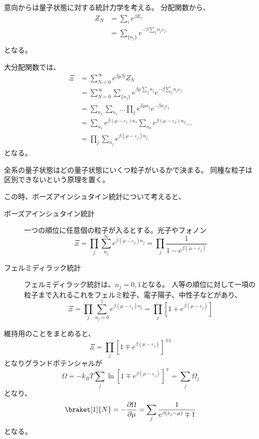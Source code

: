 \documentclass[titlepage]{ltjsarticle}
\newcommand{\ev}[1]{\braket[1]{#1}}
\begin{document}
意向からは量子状態に対する統計力学を考える。
分配関数から、
\begin{align}
  Z_N & = \sum_i e^{\beta E_i} \\
  & = \sum_{\{n_j\}} e^{-\beta \sum_j n_j \varepsilon_j} \\
\end{align}
となる。

大分配関数では、
\begin{align}
  \Xi & = \sum_{N=0}^{\infty}e^{\beta \mu N} Z_N \\
  & = \sum_{N=0}^{\infty}\sum_{\{n_j\}}^{}e^{\beta \mu \sum_j n_j} e^{-\beta \sum_j n_j \varepsilon_j} \\
  & = \sum_{n_1}\sum_{n_1}\dots \prod_j e^{\beta \mu n_j} e^{-\beta n_j \varepsilon_j} \\
  & = \sum_{n_1} e^{\beta(\mu - \varepsilon_1)n_1}\sum_{n_2} e^{\beta(\mu - \varepsilon_2)n_2}\dots \\
  & = \prod_j \sum_{n_j} e^{\beta(\mu - \varepsilon_j)n_j} 
\end{align}
となる。

全系の量子状態はどの量子状態にいくつ粒子がいるかで決まる。
同種な粒子は区別できないという原理を置く。

この時、ボーズアインシュタイン統計について考えると、
\begin{description}
  \item[ボーズアインシュタイン統計] 一つの順位に任意個の粒子が入るとする。光子やフォノン
  \begin{equation}
    \Xi = \prod_j \sum_{n_j}^{\infty}e^{\beta(\mu-\varepsilon_j)n_j} = \prod_j \frac{1}{1-e^{\beta(\mu-\varepsilon_j)}}
  \end{equation}
  \item[フェルミディラック統計] フェルミディラック統計は、\(n_j=0,1\)となる。
  人等の順位に対して一項の粒子まで入れるこれをフェルミ粒子、電子陽子、中性子などがあり、
  \begin{equation}
    \Xi = \prod_j \sum^1_{n_j=0} e^{\beta(\mu - \varepsilon_j)n_j} = \prod_j \left[ 1 + e^{\beta(\mu-\varepsilon_j)} \right]
  \end{equation}
\end{description}
維持用のことをまとめると、
\begin{equation}
  \Xi = \prod_j \left[ 1 \mp e^{\beta(\mu-\varepsilon_j)} \right]^{\mp 1}
\end{equation}
となりグランドポテンシャルが
\begin{equation}
  \Omega = -k_BT \sum_j \ln \left[ 1 \mp e^{\beta(\mu-\varepsilon_j)} \right]^{\mp} = \sum_j \Omega_j 
\end{equation}
となり、
\begin{equation}
  \ev{N} = - \pdv{\Omega}{\mu} = \sum_j \frac{1}{e^{\beta(\varepsilon_j-\mu)} \mp 1}
\end{equation}
となる。
\end{document}
